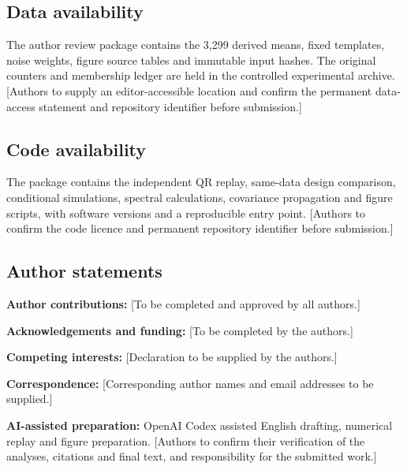 \documentclass[
  10pt,
  a4paper,
]{article}
\begin{document}
\singlespacing

\hypertarget{data-availability}{%
\subsection{Data availability}\label{data-availability}}

The author review package contains the 3,299 derived means, fixed
templates, noise weights, figure source tables and immutable input
hashes. The original counters and membership ledger are held in the
controlled experimental archive. {[}Authors to supply an
editor-accessible location and confirm the permanent data-access
statement and repository identifier before submission.{]}

\singlespacing

\hypertarget{code-availability}{%
\subsection{Code availability}\label{code-availability}}

The package contains the independent QR replay, same-data design
comparison, conditional simulations, spectral calculations, covariance
propagation and figure scripts, with software versions and a
reproducible entry point. {[}Authors to confirm the code licence and
permanent repository identifier before submission.{]}

\singlespacing

\hypertarget{author-statements}{%
\subsection{Author statements}\label{author-statements}}

\textbf{Author contributions:} {[}To be completed and approved by all
authors.{]}

\textbf{Acknowledgements and funding:} {[}To be completed by the
authors.{]}

\textbf{Competing interests:} {[}Declaration to be supplied by the
authors.{]}

\textbf{Correspondence:} {[}Corresponding author names and email
addresses to be supplied.{]}

\textbf{AI-assisted preparation:} OpenAI Codex assisted English
drafting, numerical replay and figure preparation. {[}Authors to confirm
their verification of the analyses, citations and final text, and
responsibility for the submitted work.{]}
\end{document}
